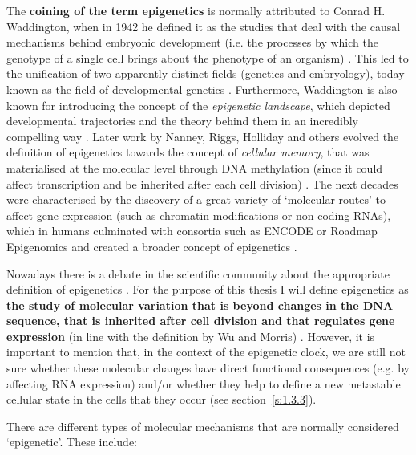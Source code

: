 \smallskip

The \textbf{coining of the term epigenetics} is normally attributed to Conrad H. Waddington, when in 1942 he defined it as the studies that deal with the causal mechanisms behind embryonic development (i.e. the processes by which the genotype of a single cell brings about the phenotype of an organism) \cite{Waddington1942}. This led to the unification of two apparently distinct fields (genetics and embryology), today known as the field of developmental genetics \cite{Gilbert2011}. Furthermore, Waddington is also known for introducing the concept of the \textit{epigenetic landscape}, which depicted developmental trajectories and the theory behind them in an incredibly compelling way \cite{Waddington1957}. Later work by Nanney, Riggs, Holliday and others evolved the definition of epigenetics towards the concept of \textit{cellular memory}, that was materialised at the molecular level through DNA methylation (since it could affect transcription and be inherited after each cell division) \cite{Lappalainen2017}. The next decades were characterised by the discovery of a great variety of `molecular routes' to affect gene expression (such as chromatin modifications or non-coding RNAs), which in humans culminated with consortia such as ENCODE \cite{Consortium2012} or Roadmap Epigenomics \cite{Consortium2015} and created a broader concept of epigenetics \cite{Lappalainen2017,Greally2018}.

\bigskip

Nowadays there is a debate in the scientific community about the appropriate definition of epigenetics \cite{Greally2018,Bird2007}. For the purpose of this thesis I will define epigenetics as \textbf{the study of molecular variation that is beyond changes in the DNA sequence, that is inherited after cell division and that regulates gene expression} (in line with the definition by Wu and Morris) \cite{Wu2001}. However, it is important to mention that, in the context of the epigenetic clock, we are still not sure whether these molecular changes have direct functional consequences (e.g. by affecting RNA expression) and/or whether they help to define a new metastable cellular state in the cells that they occur (see section~\ref{s:1.3.3}).

\bigskip

There are different types of molecular mechanisms that are normally considered `epigenetic'. These include:

